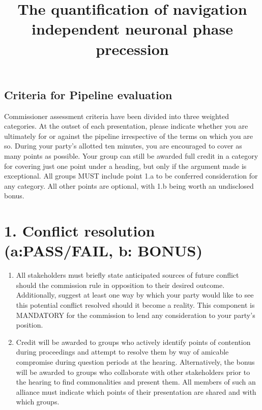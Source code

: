 \documentclass[12pt, letterpaper]{article}
\title{The quantification of navigation independent neuronal phase precession}
\author{}
\date{}
\begin{document}
\begin{center}
  {\section*{\normalfont\normalsize\bf Criteria for Pipeline evaluation}}
\end{center}

\vspace{12pt}

\noindent Commissioner assessment criteria have been divided into three weighted
categories. At the outset of each presentation, please indicate whether you are
ultimately for or against the pipeline irrespective of the terms on which you
are so. During your party’s allotted ten minutes, you are encouraged to cover as
many points as possible. Your group can still be awarded full credit in a
category for covering just one point under a heading, but only if the argument
made is exceptional. All groups MUST include point 1.a to be conferred
consideration for any category. All other points are optional, with 1.b being
worth an undisclosed bonus.

\vspace{12pt}

\section*{\normalfont\normalsize\bf 1. Conflict resolution (a:PASS/FAIL, b:
  BONUS)}
\begin{enumerate}[label={\bf\alph*}.]
\item All stakeholders must briefly state anticipated sources of future conflict
  should the commission rule in opposition to their desired outcome.
  Additionally, suggest at least one way by which your party would like to see
  this potential conflict resolved should it become a reality. This component is
  MANDATORY for the commission to lend any consideration to your party’s
  position.
\item Credit will be awarded to groups who actively identify points of
  contention during proceedings and attempt to resolve them by way of amicable
  compromise during question periods at the hearing. Alternatively, the bonus
  will be awarded to groups who collaborate with other stakeholders prior to the
  hearing to find commonalities and present them. All members of such an
  alliance must indicate which points of their presentation are shared and with
  which groups.
\end{enumerate}
\end{document}
